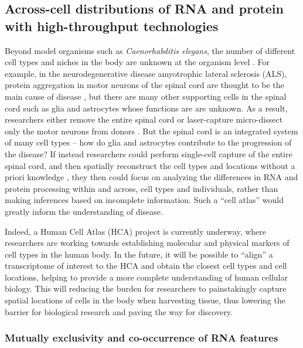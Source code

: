 \subsection{Across-cell distributions of RNA and protein with high-throughput technologies}

Beyond model organisms such as \emph{Caenorhabditis elegans}, the number of different cell types and niches in the body are unknown at the organism level \cite{Deppe1978-dd,Ellis1986-oz}. For example, in the neurodegenerative disease amyotrophic lateral sclerosis (ALS), protein aggregation in motor neurons of the spinal cord are thought to be the main cause of disease \cite{Da_Silva2014-dv,Polymenidou2011-ah}, but there are many other supporting cells in the spinal cord such as glia and astrocytes whose functions are are unknown. As a result, researchers either remove the entire spinal cord or laser-capture micro-dissect only the motor neurons from donors \cite{Aulas2012-uc,Gal2011-mg,Martinez2016-sv}. But the spinal cord is an integrated system of many cell types -- how do glia and astrocytes contribute to the progression of the disease? If instead researchers could perform single-cell capture of the entire spinal cord,  and then spatially reconstruct the cell types and locations without a priori knowledge \cite{Achim2015-sf,Mori2017-xr,Pettit2014-od,Satija2015-hi}, they then could focus on analyzing the differences in RNA and protein processing within and across, cell types and individuals, rather than making inferences based on incomplete information. Such a ``cell atlas'' would greatly inform the understanding of disease.

Indeed, a Human Cell Atlas (HCA) \cite{Linnarsson2016-dk,Regev2016-li,Wagner2016-mi} project is currently underway, where researchers are working towards establishing molecular and physical markers of cell types in the human body. In the future, it will be possible to ``align'' a transcriptome of interest to the HCA and obtain the closest cell types and cell locations, helping to provide a more complete understanding of human cellular biology. This will reducing the burden for researchers to painstakingly capture spatial locations of cells in the body when harvesting tissue, thus lowering the barrier for biological research and paving the way for discovery.


\subsubsection{Mutually exclusivity and co-occurrence of RNA features}

